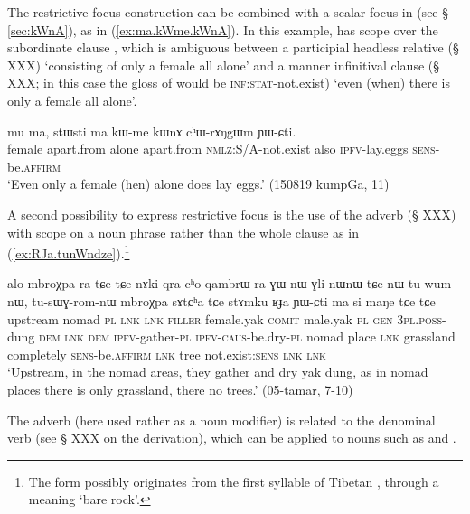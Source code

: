The restrictive focus construction can be combined with a scalar focus in  (see §  \ref{sec:kWnA}), as in (\ref{ex:ma.kWme.kWnA}). In this example,  has scope over the subordinate clause , which is ambiguous between a participial headless relative (§ XXX) `consisting of only a female all alone' and a manner infinitival clause (§ XXX; in this case the gloss of  would be \textsc{inf}:\textsc{stat}-not.exist) `even (when) there is only a female all alone'.

  \begin{exe}
\ex \label{ex:ma.kWme.kWnA}
\gll  mu ma, stɯsti ma kɯ-me kɯnɤ cʰɯ-rɤŋgɯm ɲɯ-ɕti. \\
female apart.from alone apart.from \textsc{nmlz}:S/A-not.exist also \textsc{ipfv}-lay.eggs \textsc{sens}-be.\textsc{affirm} \\
\glt `Even only a female (hen) alone does lay eggs.' (150819 kumpGa, 11)
\end{exe}
   
A second possibility to express restrictive focus is the use of the adverb  (§ XXX) with scope on a  noun phrase rather than the whole clause as in (\ref{ex:RJa.tunWndze}).\footnote{The form  possibly originates from the first syllable of Tibetan , through a meaning `bare rock'.}  

\begin{exe}
\ex \label{ex:stAmku.RJa}
\gll alo mbroχpa ra tɕe tɕe nɤki qra cʰo qambrɯ ra ɣɯ nɯ-ɣli nɯnɯ
tɕe nɯ tu-wum-nɯ, tu-sɯɣ-rom-nɯ mbroχpa sɤtɕʰa tɕe stɤmku ʁɟa ɲɯ-ɕti ma si maŋe tɕe tɕe    \\
upstream nomad \textsc{pl} \textsc{lnk} \textsc{lnk} \textsc{filler} female.yak \textsc{comit} male.yak \textsc{pl} \textsc{gen} \textsc{3pl}.\textsc{poss}-dung \textsc{dem} \textsc{lnk} \textsc{dem} \textsc{ipfv}-gather-\textsc{pl} \textsc{ipfv}-\textsc{caus}-be.dry-\textsc{pl} nomad place \textsc{lnk} grassland completely \textsc{sens}-be.\textsc{affirm} \textsc{lnk} tree not.exist:\textsc{sens} \textsc{lnk} \textsc{lnk}  \\
\glt `Upstream, in the nomad areas, they gather and dry yak dung, as in nomad places there is only grassland, there no trees.' (05-tamar, 7-10)
\end{exe}

The adverb  (here used rather as a noun modifier) is related to the denominal verb  (see § XXX on the  derivation), which can be applied to nouns such as  and .
 
